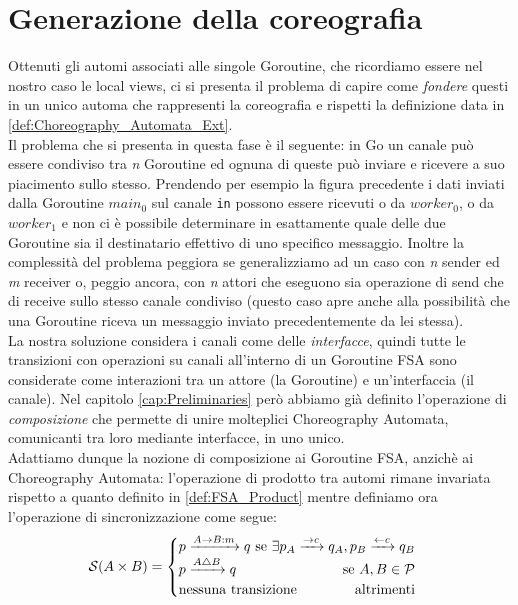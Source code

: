 \section{Generazione della coreografia}
Ottenuti gli automi associati alle singole Goroutine, che ricordiamo essere nel nostro caso le local views, ci si presenta il problema di capire come \emph{fondere} questi in un unico automa che rappresenti la coreografia e rispetti la definizione data in \ref{def:Choreography_Automata_Ext}.\bigskip \\
Il problema che si presenta in questa fase è il seguente: in Go un canale può essere condiviso tra \emph{n} Goroutine ed ognuna di queste può inviare e ricevere a suo piacimento sullo stesso. Prendendo per esempio la figura precedente i dati inviati dalla Goroutine $main_0$ sul canale \texttt{in} possono essere ricevuti o da $worker_0$, o da $worker_1$ e non ci è possibile determinare in esattamente quale delle due Goroutine sia il destinatario effettivo di uno specifico messaggio. Inoltre la complessità del problema peggiora se generalizziamo ad un caso con \emph{n} sender ed \emph{m} receiver o, peggio ancora, con \emph{n} attori che eseguono sia operazione di send che di receive sullo stesso canale condiviso (questo caso apre anche alla possibilità che una Goroutine riceva un messaggio inviato precedentemente da lei stessa). \bigskip \\
La nostra soluzione considera i canali come delle \emph{interfacce}, quindi tutte le transizioni con operazioni su canali all'interno di un Goroutine FSA sono considerate come interazioni tra un attore (la Goroutine) e un'interfaccia (il canale). Nel capitolo \ref{cap:Preliminaries} però abbiamo già definito l'operazione di \emph{composizione} che permette di unire molteplici Choreography Automata, comunicanti tra loro mediante interfacce, in uno unico.\\
Adattiamo dunque la nozione di composizione ai Goroutine FSA, anzichè ai Choreography Automata: l'operazione di prodotto tra automi rimane invariata rispetto a quanto definito in \ref{def:FSA_Product} mentre definiamo ora l'operazione di sincronizzazione come segue:
\begin{equation*}
    \mathcal{S}(A \times B) =
    \begin{cases}
        p \xrightarrow{A \rightarrow B: m} q \hfill \text{ se } \exists p_A \xrightarrow{\rightarrow c} q_A,  p_B \xrightarrow{\leftarrow c} q_B \\
        p \xrightarrow{A \bigtriangleup B} q \hfill \text{ se } A, B\in \mathcal{P}                                                              \\
        \text{nessuna transizione} \hfill \text{altrimenti}
    \end{cases}
\end{equation*}
